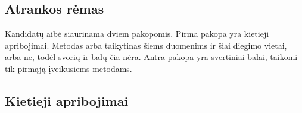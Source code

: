 %
%

\subsection{Atrankos rėmas}
\label{sec:remas}

Kandidatų aibė siaurinama dviem pakopomis. Pirma pakopa yra kietieji
apribojimai. Metodas arba taikytinas šiems duomenims ir šiai diegimo
vietai, arba ne, todėl svorių ir balų čia nėra. Antra pakopa yra
svertiniai balai, taikomi tik pirmąją įveikusiems metodams.

\subsection{Kietieji apribojimai}
\label{sec:filtras}

%

